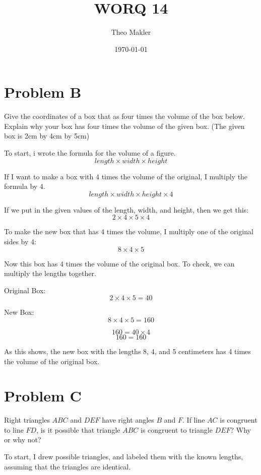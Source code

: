 \documentclass[a4paper]{article}
\title{WORQ 14}
\author{Theo Makler}
\date{\today}
\begin{document}
\maketitle

\section{Problem B}

Give the coordinates of a box that as four times the volume of the box below. Explain why your box has four times the volume of the given box. (The given box is 2cm by 4cm by 5cm)

To start, i wrote the formula for the volume of a figure.
$$length \times width \times height$$

If I want to make a box with 4 times the volume of the original, I multiply the formula by 4.
$$length \times width \times height \times 4$$

If we put in the given values of the length, width, and height, then we get this:
$$2\times4\times5\times4$$ 

To make the new box that has 4 times the volume, I multiply one of the original sides by 4:
$$8\times4\times5$$

Now this box has 4 times the volume of the original box. To check, we can multiply the lengths together.

Original Box:
$$2\times4\times5=40$$

New Box:
$$8\times4\times5=160$$

$$160=40\times4$$
$$160=160$$

As this shows, the new box with the lengths 8, 4, and 5 centimeters has 4 times the volume of the original box.

\pagebreak

\section{Problem C}

Right triangles $ABC$ and $DEF$ have right angles $B$ and $F$. If line $AC$ is congruent to line $FD$, is it possible that triangle $ABC$ is congruent to triangle $DEF$? Why or why not?

To start, I drew possible triangles, and labeled them with the known lengths, assuming that the triangles are identical.
\end{document}
